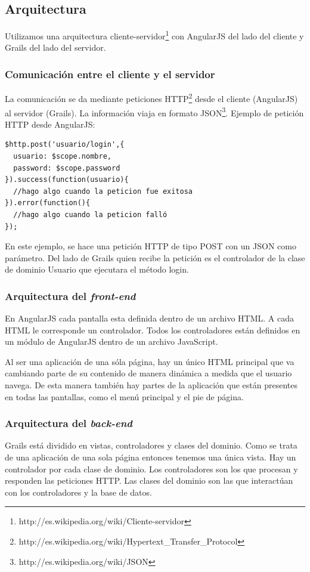 \subsection{Arquitectura}
Utilizamos una arquitectura cliente-servidor\footnote{http://es.wikipedia.org/wiki/Cliente-servidor} con AngularJS del lado del cliente y Grails del lado del servidor.

\subsubsection{Comunicación entre el cliente y el servidor}
La comunicación se da mediante peticiones HTTP\footnote{http://es.wikipedia.org/wiki/Hypertext\_Transfer\_Protocol} desde el cliente (AngularJS) al servidor (Grails). La información viaja en formato JSON\footnote{http://es.wikipedia.org/wiki/JSON}. Ejemplo de petición HTTP desde AngularJS:

\begin{verbatim}
$http.post('usuario/login',{
  usuario: $scope.nombre,
  password: $scope.password
}).success(function(usuario){
  //hago algo cuando la peticion fue exitosa
}).error(function(){
  //hago algo cuando la peticion falló
});		
\end{verbatim}

En este ejemplo, se hace una petición HTTP de tipo POST con un JSON como parámetro. Del lado de Grails quien recibe la petición es el controlador de la clase de dominio Usuario que ejecutara el método login.

\subsubsection{Arquitectura del \textit{front-end}}
En AngularJS cada pantalla esta definida dentro de un archivo HTML. A cada HTML le corresponde un controlador. Todos los controladores están definidos en un módulo de AngularJS dentro de un archivo JavaScript.

Al ser una aplicación de una sóla página, hay un único HTML principal que va cambiando parte de su contenido de manera dinámica a medida que el usuario navega. De esta manera también hay partes de la aplicación que están presentes en todas las pantallas, como el menú principal y el pie de página.

\subsubsection{Arquitectura del \textit{back-end}}
Grails está dividido en vistas, controladores y clases del dominio. Como se trata de una aplicación de una sola página entonces tenemos una única vista. Hay un controlador por cada clase de dominio. Los controladores son los que procesan y responden las peticiones HTTP. Las clases del dominio son las que interactúan con los controladores y la base de datos.


